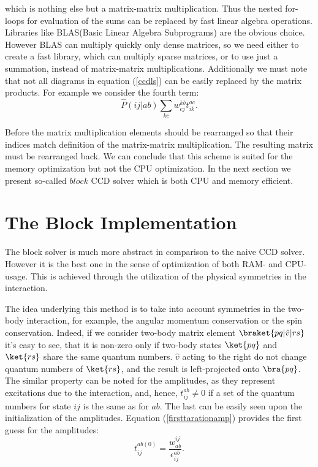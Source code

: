 \documentclass[twoside,english]{uiofysmaster}
\begin{document}
which is nothing else but a matrix-matrix multiplication. Thus the
nested for-loops for evaluation of the sums can be replaced by fast
linear algebra operations. Libraries like BLAS(Basic Linear Algebra
Subprograms) are the obvious choice. However BLAS can multiply quickly
only dense matrices, so we need either to create a fast library, which
can multiply sparse matrices, or to use just a summation, instead of
matrix-matrix multiplications.  Additionally we must note that not all
diagrams in equation (\ref{ccdls}) can be easily replaced by the
matrix products. For example we consider the fourth term:
\[
\hat{P}(ij|ab)\sum_{kc}w_{cj}^{kb}t_{ik}^{ac}.
\]

Before the matrix multiplication elements should be rearranged so that
their indices match definition of the matrix-matrix
multiplication. The resulting matrix must be rearranged back. We can
conclude that this scheme is suited for the memory optimization but
not the CPU optimization. In the next section we present so-called
$block$ CCD solver which is both CPU and memory efficient.

\section{The Block Implementation}
The block solver is much more abstract in comparison to the naive CCD
solver. However it is the best one in the  sense of optimization of both
RAM- and CPU-usage. This is achieved through the utilization of the
physical symmetries in the interaction.

The idea underlying this method is to take into account symmetries in
the two-body interaction, for example, the angular momentum
conservation or the spin conservation. Indeed, if we consider two-body
matrix element $\braket{pq|\hat{v}|rs}$ it's easy to see, that it is
non-zero only if two-body states $\ket{pq}$ and $\ket{rs}$ share the
same quantum numbers. $\hat{v}$ acting to the right do not change
quantum numbers of $\ket{rs}$, and the result is left-projected onto
$\bra{pq}$. The similar property can be noted for the amplitudes, as
they represent excitations due to the interaction, and, hence,
$t_{ij}^{ab} \neq 0$ if a set of the quantum numbers for state $ij$ is
the same as for $ab$. The last can be easily seen upon the
initialization of the amplitudes. Equation (\ref{firsttarationamp})
provides the first guess for the amplitudes:
\begin{equation}\label{ampnonzero}
t_{ij}^{ab(0)} = \frac{w_{ab}^{ij}}{\epsilon_{ij}^{ab}}.
\end{equation}
\end{document}

